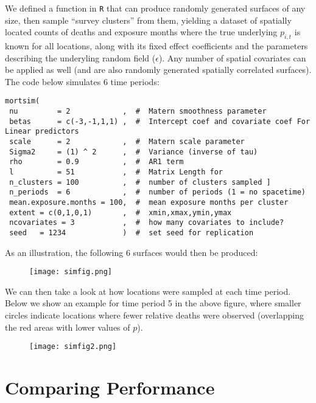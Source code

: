 \documentclass[12pt]{article}
\begin{document}
We defined a function in \texttt{R} that can produce randomly generated surfaces of any size, then sample ``survey clusters'' from them, yielding a dataset of spatially located counts of deaths and exposure months where the true underlying $p_{i,t}$ is known for all locations, along with its fixed effect coefficients and the parameters describing the underyling random field ($\epsilon$). Any number of spatial covariates can be applied as well (and are also randomly generated spatially correlated surfaces). The code below simulates 6 time periods:

\begin{Verbatim}[fontsize=\relsize{-4}]
mortsim(
 nu         = 2            ,  #  Matern smoothness parameter 
 betas      = c(-3,-1,1,1) ,  #  Intercept coef and covariate coef For Linear predictors
 scale      = 2            ,  #  Matern scale parameter
 Sigma2     = (1) ^ 2      ,  #  Variance (inverse of tau)
 rho        = 0.9          ,  #  AR1 term
 l          = 51           ,  #  Matrix Length for 
 n_clusters = 100          ,  #  number of clusters sampled ]
 n_periods  = 6            ,  #  number of periods (1 = no spacetime)
 mean.exposure.months = 100,  #  mean exposure months per cluster
 extent = c(0,1,0,1)       ,  #  xmin,xmax,ymin,ymax
 ncovariates = 3           ,  #  how many covariates to include?
 seed   = 1234             )  #  set seed for replication
\end{Verbatim}

As an illustration, the following 6 surfaces would then be produced:

\begin{figure}[H]
\centering
\texttt{[image: simfig.png]}
\end{figure}


We can then take a look at how locations were sampled at each time period. Below we show an example for time period 5 in the above figure, where smaller circles indicate locations where fewer relative deaths were observed (overlapping the red areas with lower values of $p$).

\begin{figure}[H]
\centering
\texttt{[image: simfig2.png]}
\end{figure}




\section{Comparing Performance}
\end{document}
